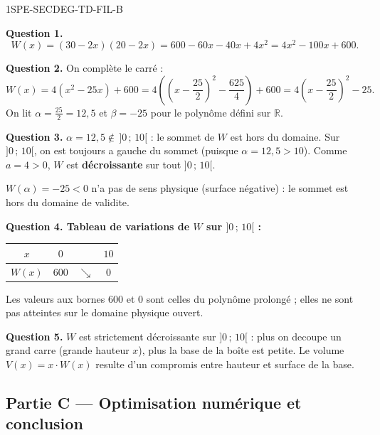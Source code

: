 \begin{corrige}{1SPE-SECDEG-TD-FIL-B}

\textbf{Question 1.}
\[
W(x) = (30-2x)(20-2x) = 600 - 60x - 40x + 4x^2 = 4x^2 - 100x + 600.
\]

\textbf{Question 2.} On complète le carré :
\[
W(x)=4(x^2-25x)+600
=4\left(\left(x-\frac{25}{2}\right)^2-\frac{625}{4}\right)+600
=4\left(x-\frac{25}{2}\right)^2-25.
\]
On lit $\alpha=\frac{25}{2}=12{,}5$ et $\beta=-25$ pour le polynôme défini sur $\mathbb{R}$.

\textbf{Question 3.} $\alpha = 12{,}5 \notin \,]0\,;\,10[$ : le sommet de $W$ est hors du domaine. Sur $]0\,;\,10[$, on est toujours a gauche du sommet (puisque $\alpha = 12{,}5 > 10$). Comme $a = 4 > 0$, $W$ est \textbf{décroissante} sur tout $]0\,;\,10[$.

$W(\alpha) = -25 < 0$ n'a pas de sens physique (surface négative) : le sommet est hors du domaine de validite.

\textbf{Question 4. Tableau de variations de $W$ sur $]0\,;\,10[$ :}

\begin{center}
\begin{tabular}{|c|ccc|}
\hline
$x$ & $0$ & & $10$ \\
\hline
$W(x)$ & $600$ & $\searrow$ & $0$ \\
\hline
\end{tabular}
\end{center}

Les valeurs aux bornes $600$ et $0$ sont celles du polynôme prolongé ;
elles ne sont pas atteintes sur le domaine physique ouvert.

\textbf{Question 5.} $W$ est strictement décroissante sur $]0\,;\,10[$ : plus on decoupe un grand carre (grande hauteur $x$), plus la base de la boîte est petite. Le volume $V(x) = x \cdot W(x)$ resulte d'un compromis entre hauteur et surface de la base.

\end{corrige}

\bigskip

\subsection*{Partie C — Optimisation numérique et conclusion}

